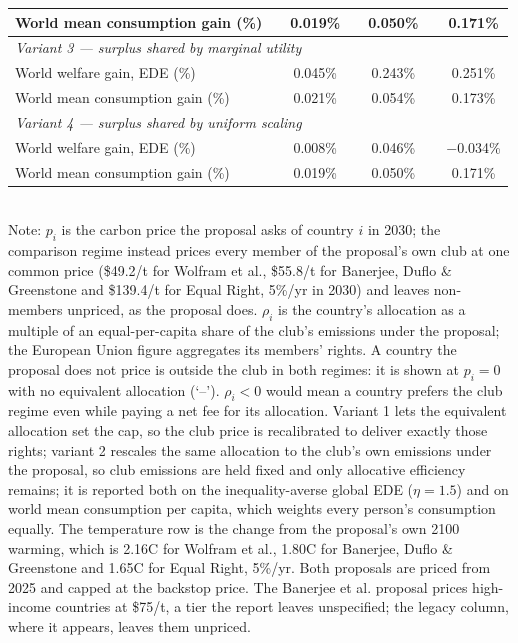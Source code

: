 \begin{table}[htbp]
\begin{tabular}{lcccccc}
  \quad World mean consumption gain (\%) &  & 0.019\% &  & 0.050\% &  & 0.171\% \\
  \midrule
  \multicolumn{7}{l}{\textit{Variant 3 --- surplus shared by marginal utility}} \\
  \quad World welfare gain, EDE (\%) &  & 0.045\% &  & 0.243\% &  & 0.251\% \\
  \quad World mean consumption gain (\%) &  & 0.021\% &  & 0.054\% &  & 0.173\% \\
  \midrule
  \multicolumn{7}{l}{\textit{Variant 4 --- surplus shared by uniform scaling}} \\
  \quad World welfare gain, EDE (\%) &  & 0.008\% &  & 0.046\% &  & $-$0.034\% \\
  \quad World mean consumption gain (\%) &  & 0.019\% &  & 0.050\% &  & 0.171\% \\
  \bottomrule
\end{tabular}
\label{tab:equiv_rights_A}
\\[4pt]
{\footnotesize Note: $p_i$ is the carbon price the proposal asks of country $i$ in 2030; the comparison regime instead prices every member of the proposal's own club at one common price (\$49.2/t for Wolfram et al., \$55.8/t for Banerjee, Duflo \& Greenstone and \$139.4/t for Equal Right, 5\%/yr in 2030) and leaves non-members unpriced, as the proposal does. $\rho_i$ is the country's allocation as a multiple of an equal-per-capita share of the club's emissions under the proposal; the European Union figure aggregates its members' rights. A country the proposal does not price is outside the club in both regimes: it is shown at $p_i=0$ with no equivalent allocation (`--'). $\rho_i < 0$ would mean a country prefers the club regime even while paying a net fee for its allocation. Variant 1 lets the equivalent allocation set the cap, so the club price is recalibrated to deliver exactly those rights; variant 2 rescales the same allocation to the club's own emissions under the proposal, so club emissions are held fixed and only allocative efficiency remains; it is reported both on the inequality-averse global EDE ($\eta=1.5$) and on world mean consumption per capita, which weights every person's consumption equally. The temperature row is the change from the proposal's own 2100 warming, which is 2.16\textdegree{}C for Wolfram et al., 1.80\textdegree{}C for Banerjee, Duflo \& Greenstone and 1.65\textdegree{}C for Equal Right, 5\%/yr. Both proposals are priced from 2025 and capped at the backstop price. The Banerjee et al. proposal prices high-income countries at \$75/t, a tier the report leaves unspecified; the legacy column, where it appears, leaves them unpriced.}
\end{table}
